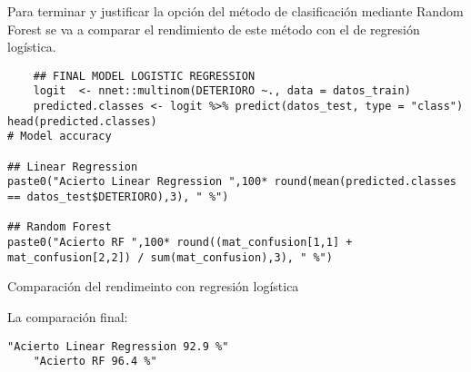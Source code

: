 Para terminar y justificar la opción del método de clasificación mediante Random Forest se va a comparar el rendimiento de este método con el de regresión logística.
\begin{code}[H]
\begin{lstlisting}
    ## FINAL MODEL LOGISTIC REGRESSION
    logit  <- nnet::multinom(DETERIORO ~., data = datos_train)
    predicted.classes <- logit %>% predict(datos_test, type = "class")
head(predicted.classes)
# Model accuracy

## Linear Regression
paste0("Acierto Linear Regression ",100* round(mean(predicted.classes == datos_test$DETERIORO),3), " %")

## Random Forest
paste0("Acierto RF ",100* round((mat_confusion[1,1] + mat_confusion[2,2]) / sum(mat_confusion),3), " %")
\end{lstlisting}
\caption{Comparación del rendimeinto con regresión logística}
\label{code:Comparación del rendimeinto con regresión logística}
\end{code}

La comparación final: 

\begin{lstlisting}[style=mystyle]
    "Acierto Linear Regression 92.9 %"
    "Acierto RF 96.4 %"
\end{lstlisting}



